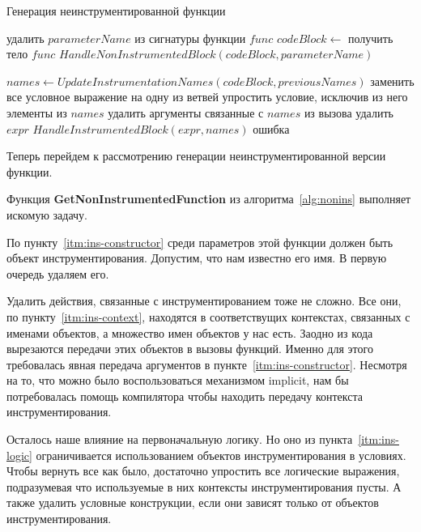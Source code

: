\begin{algorithm}
\caption{Генерация неинструментированной функции}\label{alg:nonins}
\begin{algorithmic}[1]
  \State удалить $parameterName$ из сигнатуры функции $func$
  \State $codeBlock \gets$ получить тело $func$
  \State $HandleNonInstrumentedBlock(codeBlock, parameterName)$
\EndFunction

  \State $names \gets UpdateInstrumentationNames(codeBlock, previousNames)$
      \State заменить все условное выражение на одну из ветвей
      \State упростить условие, исключив из него элементы из $names$
      \State удалить аргументы связанные с $names$ из вызова
      \State удалить $expr$
      \State $HandleInstrumentedBlock(expr, names)$
      \State \Return ошибка
    \EndIf
  \EndFor
\EndFunction
\end{algorithmic}
\end{algorithm}

Теперь перейдем к рассмотрению генерации неинструментированной версии функции.

Функция \textbf{GetNonInstrumentedFunction} из алгоритма~\ref{alg:nonins}
выполняет искомую задачу.

По пункту~\ref{itm:ins-constructor} среди параметров этой функции должен быть
объект инструментирования.
Допустим, что нам известно его имя.
В первую очередь удаляем его.

Удалить действия, связанные с инструментированием тоже не сложно.
Все они, по пункту~\ref{itm:ins-context}, находятся в соответствущих контекстах,
связанных с именами объектов, а множество имен объектов у нас есть.
Заодно из кода вырезаются передачи этих объектов в вызовы функций.
Именно для этого требовалась явная передача аргументов в
пункте~\ref{itm:ins-constructor}.
Несмотря на то, что можно было воспользоваться механизмом implicit,
нам бы потребовалась помощь компилятора чтобы находить передачу контекста
инструментирования.

Осталось наше влияние на первоначальную логику.
Но оно из пункта~\ref{itm:ins-logic} ограничивается использованием объектов
инструментирования в условиях.
Чтобы вернуть все как было, достаточно упростить все логические выражения,
подразумевая что используемые в них контексты инструментирования пусты.
А также удалить условные конструкции, если они зависят только от объектов
инструментирования.

